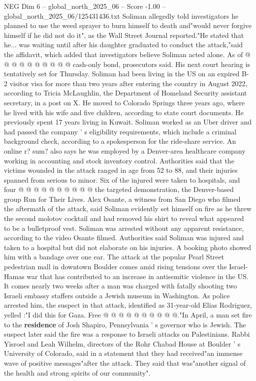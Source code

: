 \begin{textsample}{NEG Dim 6 – global\_north\_2025\_06 – Score -1.00 – global\_north\_2025\_06/125431436.txt}
Soliman allegedly told investigators he planned to use the weed sprayer to burn himself to death and"would never forgive himself if he did not do it", as the Wall Street Journal reported."He stated that he... was waiting until after his daughter graduated to conduct the attack,"said the affidavit, which added that investigators believe Soliman acted alone.
As of @ @ @ @ @ @ @ @ @ @ cash-only bond, prosecutors said.
His next court hearing is tentatively set for Thursday.
Soliman had been living in the US on an expired B-2 visitor visa for more than two years after entering the country in August 2022, according to Tricia McLaughlin, the Department of Homeland Security assistant secretary, in a post on X.
He moved to Colorado Springs three years ago, where he lived with his wife and five children, according to state court documents.
He previously spent 17 years living in Kuwait.
Soliman worked as an Uber driver and had passed the company ' s eligibility requirements, which include a criminal background check, according to a spokesperson for the ride-share service.
An online r? sum? also says he was employed by a Denver-area healthcare company working in accounting and stock inventory control.
Authorities said that the victims wounded in the attack ranged in age from 52 to 88, and their injuries spanned from serious to minor.
Six of the injured were taken to hospitals, and four @ @ @ @ @ @ @ @ @ @ the targeted demonstration, the Denver-based group Run for Their Lives.
Alex Osante, a witness from San Diego who filmed the aftermath of the attack, said Soliman evidently set himself on fire as he threw the second molotov cocktail and had removed his shirt to reveal what appeared to be a bulletproof vest.
Soliman was arrested without any apparent resistance, according to the video Osante filmed.
Authorities said Soliman was injured and taken to a hospital but did not elaborate on his injuries.
A booking photo showed him with a bandage over one ear.
The attack at the popular Pearl Street pedestrian mall in downtown Boulder comes amid rising tensions over the Israel-Hamas war that has contributed to an increase in antisemitic violence in the US.
It comes nearly two weeks after a man was charged with fatally shooting two Israeli embassy staffers outside a Jewish museum in Washington.
As police arrested him, the suspect in that attack, identified as 31-year-old Elias Rodriguez, yelled :"I did this for Gaza.
Free @ @ @ @ @ @ @ @ @ @."In April, a man set fire to the \textbf{residence} of Josh Shapiro, Pennsylvania ' s governor who is Jewish.
The suspect later said the fire was a response to Israeli attacks on Palestinians.
Rabbi Yisroel and Leah Wilhelm, directors of the Rohr Chabad House at Boulder ' s University of Colorado, said in a statement that they had received"an immense wave of positive messages"after the attack.
They said that was"another signal of the health and strong spirits of our community".

\end{textsample}

